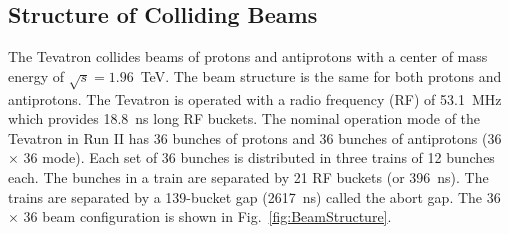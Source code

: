 \subsection{Structure of Colliding Beams}
The Tevatron collides beams of protons and antiprotons with a center of mass energy of $\sqrt{s}=1.96$~TeV. The beam structure is the same for both protons and antiprotons. The Tevatron is operated with a radio frequency (RF) of 53.1~MHz which provides 18.8~ns long RF buckets. The nominal operation mode of the Tevatron in Run II has 36 bunches of protons and 36 bunches of antiprotons (36~$\times$ 36 mode). Each set of 36 bunches is distributed in three trains of 12 bunches each. The bunches in a train are separated by 21 RF buckets (or 396~ns). The trains are separated by a 139-bucket gap (2617~ns) called the abort gap. The 36~$\times$ 36 beam configuration is shown in Fig.~\ref{fig:BeamStructure}.

